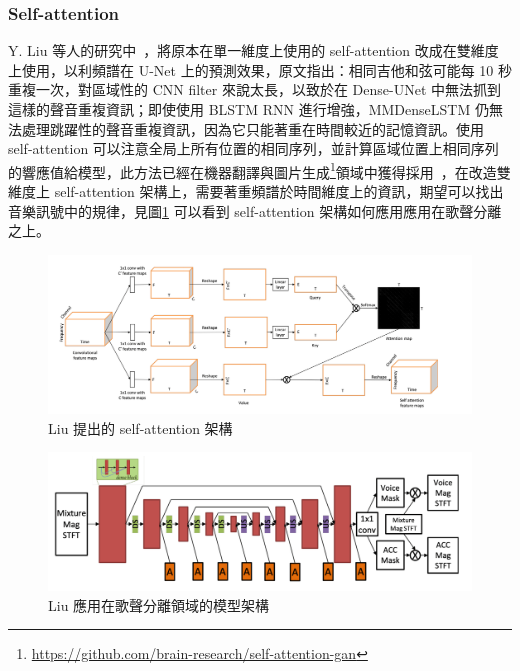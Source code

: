 \subsubsection{Self-attention}
Y. Liu 等人的研究中~\cite{liu2020voice}，將原本在單一維度上使用的 self-attention 改成在雙維度上使用，以利頻譜在 U-Net 上的預測效果，原文指出：相同吉他和弦可能每 10 秒重複一次，對區域性的 CNN filter 來說太長，以致於在 Dense-UNet 中無法抓到這樣的聲音重複資訊；即使使用 BLSTM RNN 進行增強，MMDenseLSTM 仍無法處理跳躍性的聲音重複資訊，因為它只能著重在時間較近的記憶資訊。使用 self-attention 可以注意全局上所有位置的相同序列，並計算區域位置上相同序列的響應值給模型，此方法已經在機器翻譯與圖片生成\footnote{\url{https://github.com/brain-research/self-attention-gan}}領域中獲得採用~\cite{vaswani2017attention,zhang2019self}，在改造雙維度上 self-attention 架構上，需要著重頻譜於時間維度上的資訊，期望可以找出音樂訊號中的規律，見圖\ref{self-attention1} 可以看到 self-attention 架構如何應用應用在歌聲分離之上。
\begin{figure}[htbp]
    \hfil
    \begin{minipage}[t]{0.80\textwidth}
        \includegraphics[width=\textwidth]{./figures/chapter02_method/self-attention1.png}
        \caption {Liu 提出的 self-attention 架構}
        \label{self-attention1}
    \end{minipage}
    \hfil
\end{figure}
\begin{figure}[htbp]
    \hfil
    \begin{minipage}[t]{0.80\textwidth}
        \includegraphics[width=\textwidth]{./figures/chapter02_method/self-attention2.png}
        \caption {Liu 應用在歌聲分離領域的模型架構}
        \label{self-attention2}
    \end{minipage}
    \hfil
\end{figure}

